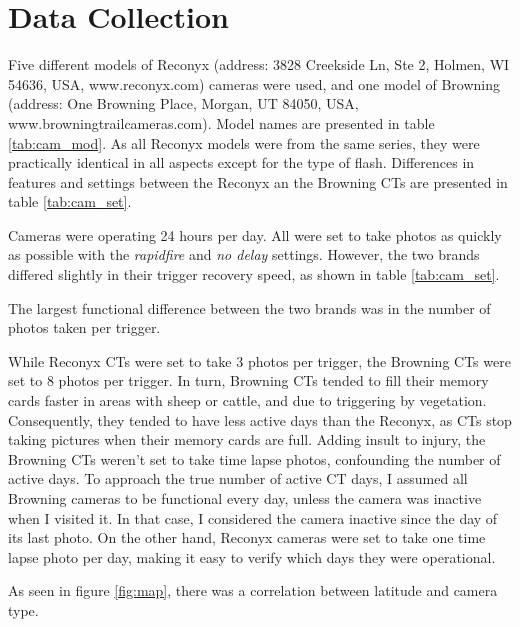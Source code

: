 \section{Data Collection} 


Five different models of Reconyx (address: 3828 Creekside Ln, Ste 2, Holmen, WI 54636, USA, www.reconyx.com) cameras were used, 
and one model of Browning (address: One Browning Place, Morgan, UT 84050, USA, www.browningtrailcameras.com).
Model names are presented in table \ref{tab:cam_mod}.  
As all Reconyx models were from the same series, they were practically identical in all aspects except for the type of flash. Differences in features and settings between the Reconyx an the Browning CTs are presented in table \ref{tab:cam_set}.


Cameras were operating 24 hours per day. All were set to take photos as quickly as possible with the \emph{rapidfire} and \emph{no delay} settings. However, the two brands differed slightly in their trigger recovery speed, as shown in table \ref{tab:cam_set}.

The largest functional difference between the two brands was in the number of photos taken per trigger. 

While Reconyx CTs were set to take 3 photos per trigger, the Browning CTs were set to 8 photos per trigger. In turn, Browning CTs tended to fill their memory cards faster in areas with sheep or cattle, and due to triggering by vegetation.
Consequently, they tended to have less active days than the Reconyx, as CTs stop taking pictures when their memory cards are full.
Adding insult to injury, the Browning CTs weren't set to take time lapse photos, confounding the number of active days.
To approach the true number of active CT days, I assumed all Browning cameras to be functional every day, unless the camera was inactive when I visited it. In that case, I considered the camera inactive since the day of its last photo.
On the other hand, Reconyx cameras were set to take one time lapse photo per day, making it easy to verify which days they were operational.






As seen in figure \ref{fig:map}, %
there was a correlation between latitude and camera type.




